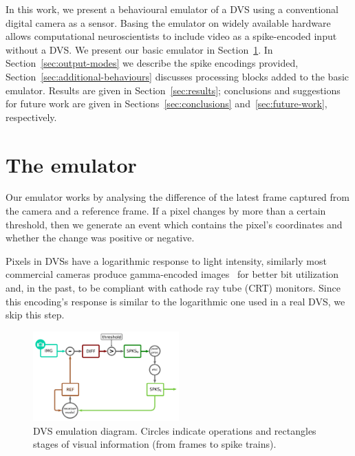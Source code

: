 \documentclass[conference]{IEEEtran}
\begin{document}
In this work, we present a behavioural emulator of a DVS using a conventional digital camera as a sensor. Basing the emulator on widely available hardware allows computational neuroscientists to include video as a spike-encoded input without a DVS. We present our basic emulator in Section~\ref{sec:basic-emulator}. In Section~\ref{sec:output-modes} we describe the spike encodings provided, Section~\ref{sec:additional-behaviours} discusses processing blocks added to the basic emulator. Results are given in Section~\ref{sec:results}; conclusions and suggestions for future work are given in Sections~\ref{sec:conclusions} and~\ref{sec:future-work}, respectively.


\section{The emulator}
\label{sec:basic-emulator}

Our emulator works by analysing the difference of the latest frame captured from the camera and a reference frame. If a pixel changes by more than a certain threshold, then we generate an event which contains the pixel's coordinates and whether the change was positive or negative. 

Pixels in DVSs have a logarithmic response to light intensity, similarly most commercial cameras produce gamma-encoded images~\cite{PoyntonDigitalVideo} for better bit utilization and, in the past, to be compliant with cathode ray tube (CRT) monitors.
Since this encoding's response is similar to the logarithmic one used in a real DVS, we skip this step.

%
\begin{figure}[htb]
  \includegraphics[width=0.5\textwidth]{dvs_emu}
  
  \caption{DVS emulation diagram. Circles indicate operations and rectangles stages of visual information (from frames to spike trains).}
  \label{fig:dvs_emu}
\end{figure}
\end{document}
